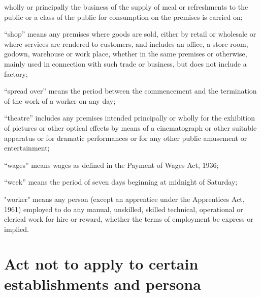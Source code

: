 \documentclass[gaz8]{mhact}
\begin{document}
\begin{subsectionlist}
wholly or principally the business of the supply of meal or refreshments
to the public or a class of the public for consumption on the premises is
carried on;
\item ``shop'' means any premises where goods are sold, either by
retail or wholesale or where services are rendered to customers, and
includes an office, a store-room, godown, warehouse or work place,
whether in the same premises or otherwise, mainly used in connection
with such trade or business, but does not include a factory;
\item ``spread over'' means the period between the commencement
and the termination of the work of a worker on any day;
\item ``theatre'' includes any premises intended principally or wholly
for the exhibition of pictures or other optical effects by means of a
cinematograph or other suitable apparatus or for dramatic performances
or for any other public amusement or entertainment;
\item ``wages'' means wages as defined in the Payment of Wages Act,
1936;
\item ``week'' means the period of seven days beginning at midnight
of Saturday;
\item "worker" means any person (except an apprentice under the
Apprentices Act, 1961) employed to do any manual, unskilled, skilled
technical, operational or clerical work for hire or reward, whether the
terms of employment be express or implied.

\end{subsectionlist}


\section{Act not to apply to certain establishments and persona}
\end{document}

